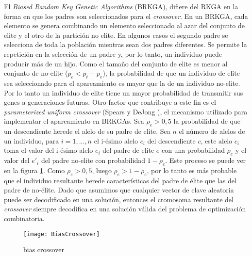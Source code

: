 El \textit{Biased Random Key Genetic Algorithms} (BRKGA), difiere del RKGA en la forma en que los padres son seleccionados para el \textit{crossover}. En un BRKGA, cada elemento se genera combinando un elemento seleccionado al azar del conjunto de elite y el otro de la partición no elite. En algunos casos el segundo padre se selecciona de toda la población mientras sean dos padres diferentes. Se permite la repetición en la selección de un padre y, por lo tanto, un individuo puede producir más de un hijo. Como el tamaño del conjunto de elite es menor al conjunto de no-elite ($p_e < p_t - p_e$), la probabilidad de que un individuo de elite sea seleccionado para el apareamiento es mayor que la de un individuo no-elite. Por lo tanto un individuo de elite tiene un mayor probabilidad de transmitir sus genes a generaciones futuras. Otro factor que contribuye a este fin es el \textit{parameterized uniform crossover} (Spears y DeJong \cite{SpearsDeJong}), el mecanismo utilizado para implementar el apareamiento en BRKGAs. Sea $\rho_e > 0,5$ la probabilidad de que un descendiente herede el alelo de su padre de elite. Sea $n$ el número de alelos de un individuo, para $i =1,...,n$ el i-ésimo alelo $c_i$ del descendiente $c$, este alelo $c_i$ toma el valor del i-ésimo alelo $e_i$ del padre de elite $e$ con una probabilidad $\rho_e$ y el valor del $e'_i$ del padre no-elite con probabilidad $1-\rho_e$. Este proceso se puede ver en la figura \ref{fig:biasCrossover}. Como $\rho_e > 0,5$, luego $\rho_e > 1 - \rho_e$, por lo tanto es más probable que el individuo resultante herede características del padre de élite que las del padre de no-élite. Dado que asumimos que cualquier vector de clave aleatoria puede ser decodificado en una solución, entonces el cromosoma resultante del \textit{crossover} siempre decodifica en una solución válida del problema de optimización combinatoria.



\begin{figure}[h]
	\caption{bias crossover}
	\centering
	\texttt{[image: BiasCrossover]}
	\label{fig:biasCrossover}
\end{figure}

